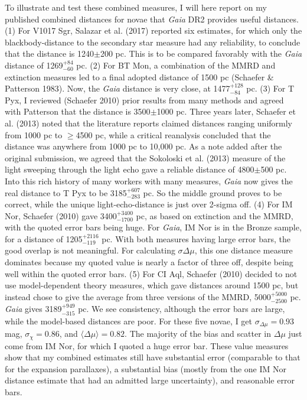\documentclass[a4paper,fleqn,usenatbib]{mnras}
\begin{document}
To illustrate and test these combined measures, I will here report on my published combined distances for novae that {\it Gaia} DR2 provides useful distances.  (1) For V1017 Sgr, Salazar et al. (2017) reported six estimates, for which only the blackbody-distance to the secondary star measure had any reliability, to conclude that the distance is 1240$\pm$200 pc.  This is to be compared favorably with the {\it Gaia} distance of 1269$_{-60}^{+84}$ pc.  (2) For BT Mon, a combination of the MMRD and extinction measures led to a final adopted distance of 1500 pc (Schaefer \& Patterson 1983).  Now, the {\it Gaia} distance is very close, at 1477$_{-84}^{+128}$ pc.  (3) For T Pyx, I reviewed (Schaefer 2010) prior results from many methods and agreed with Patterson that the distance is 3500$\pm$1000 pc.  Three years later, Schaefer et al. (2013) noted that the literature reports claimed distances ranging uniformly from 1000 pc to $\geq$4500 pc, while a critical reanalysis concluded that the distance was anywhere from 1000 pc to 10,000 pc.  As a note added after the original submission, we agreed that the Sokoloski et al. (2013) measure of the light sweeping through the light echo gave a reliable distance of 4800$\pm$500 pc.  Into this rich history of many workers with many measures, {\it Gaia} now gives the real distance to T Pyx to be 3185$_{-283}^{+607}$ pc.  So the middle ground proves to be correct, while the unique light-echo-distance is just over 2-sigma off.  (4) For IM Nor, Schaefer (2010) gave 3400$_{-1700}^{+3400}$ pc, as based on extinction and the MMRD, with the quoted error bars being huge.  For {\it Gaia}, IM Nor is in the Bronze sample, for a distance of 1205$_{-119}^{+2116}$ pc.  With both measures having large error bars, the good overlap is not meaningful.  For calculating $\sigma{\Delta \mu}$, this one distance measure dominates because my quoted value is nearly a factor of three off, despite being well within the quoted error bars.  (5) For CI Aql, Schaefer (2010) decided to not use model-dependent theory measures, which gave distances around 1500 pc, but instead chose to give the average from three versions of the MMRD, 5000$_{-2500}^{+5000}$ pc.  {\it Gaia} gives 3189$_{-315}^{+949}$ pc.  We see consistency, although the error bars are large, while the model-based distances are poor.  For these five novae, I get $\sigma _{\Delta \mu} = 0.93$ mag, $\sigma _{\chi} = 0.86$, and $\langle \Delta \mu \rangle = 0.82$.  The majority of the bias and scatter in $\Delta\mu$ just come from IM Nor, for which I quoted a huge error bar.  These value measures show that my combined estimates still have substantial error (comparable to that for the expansion parallaxes), a substantial bias (mostly from the one IM Nor distance estimate that had an admitted large uncertainty), and reasonable error bars.
\end{document}
